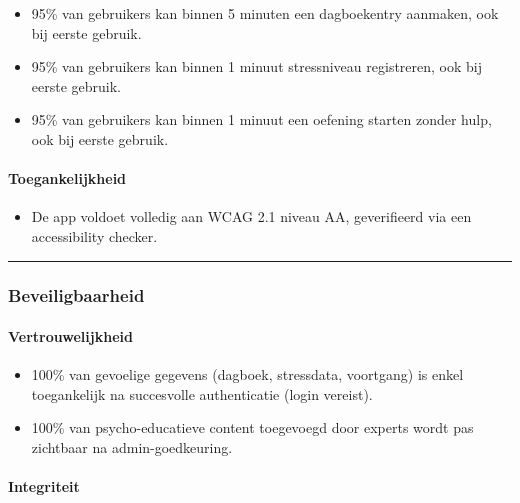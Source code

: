 \begin{itemize}
    \item 95\% van gebruikers kan binnen 5 minuten een dagboekentry aanmaken, ook bij eerste gebruik.
    \item 95\% van gebruikers kan binnen 1 minuut stressniveau registreren, ook bij eerste gebruik.
    \item 95\% van gebruikers kan binnen 1 minuut een oefening starten zonder hulp, ook bij eerste gebruik.
\end{itemize}

\paragraph{Toegankelijkheid}
\vspace{1em}

\begin{itemize}
    \item De app voldoet volledig aan WCAG 2.1 niveau AA, geverifieerd via een accessibility checker.
\end{itemize}

\vspace{1em}
\vspace{1em}
\hrule
\vspace{1em}

\subsubsection{Beveiligbaarheid}
\label{subsubsec:beveiligbaarheid}

\vspace{1em}

\paragraph{Vertrouwelijkheid}
\vspace{1em}

\begin{itemize}
    \item 100\% van gevoelige gegevens (dagboek, stressdata, voortgang) is enkel toegankelijk na succesvolle authenticatie (login vereist).
    \item 100\% van psycho-educatieve content toegevoegd door experts wordt pas zichtbaar na admin-goedkeuring.
\end{itemize}

\paragraph{Integriteit}
\vspace{1em}

